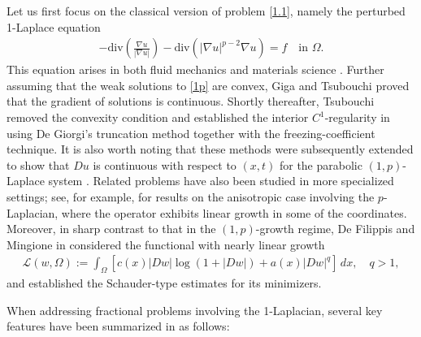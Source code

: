 \documentclass[reqno,10pt]{amsart}
\numberwithin{equation}{section}
\begin{document}
Let us first focus on the classical version of problem \eqref{1.1}, namely the perturbed 1-Laplace equation
\begin{align}
	\label{1p}
	-\mathrm{div}\left( \frac{\nabla u}{|\nabla u|}\right)-\mathrm{div}\left( |\nabla u|^{p-2}\nabla u \right) =f\quad\text{in }\Omega.
\end{align}
This equation arises in both fluid mechanics \cite{DL76} and materials science \cite{S93}. Further assuming that the weak solutions to \eqref{1p} are convex, Giga and Tsubouchi \cite{GT22} proved that the gradient of solutions is continuous. Shortly thereafter, Tsubouchi removed the convexity condition and established the interior $C^1$-regularity in \cite{T24} using De Giorgi’s truncation method together with the freezing-coefficient technique. It is also worth noting that these methods were subsequently extended to show that $Du$ is continuous with respect to $(x, t)$ for the parabolic $(1,  p)$-Laplace system \cite{T25, T24A, T25A}. Related problems have also been studied in more specialized settings; see, for example, \cite{G23, MRST10} for results on the anisotropic case involving the $p$-Laplacian, where the operator exhibits linear growth in some of the coordinates. Moreover, in sharp contrast to that in the $(1, p)$-growth regime, De Filippis and Mingione in \cite{DM23} considered the functional with nearly linear growth
\begin{align}
	\label{nearly}
	\mathcal{L}(w, \Omega):=\int_{\Omega}\left[c(x)|Dw|\log(1+|Dw|)+a(x)|Dw|^q\right]\,dx, \quad q>1,
\end{align}
and established the Schauder-type estimates for its minimizers. 





When addressing fractional problems involving the 1-Laplacian, several key features have been summarized in \cite[Subsection 1.1]{LZ25} as follows:
\end{document}
